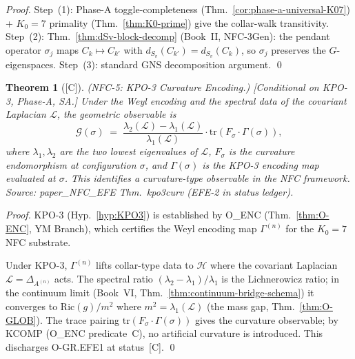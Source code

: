 \documentclass[12pt,oneside]{amsbook}
\theoremstyle{plain}
\newtheorem{theorem}{Theorem}[section]
\theoremstyle{definition}
\theoremstyle{remark}
\newcommand{\status}[1]{\textup{[#1]}}
\begin{document}
\begin{proof}
Step~(1): Phase-A toggle-completeness
(Thm.~\ref{cor:phase-a-universal-K07}) + $K_0=7$ primality
(Thm.~\ref{thm:K0-prime}) give the collar-walk transitivity.
Step~(2): Thm.~\ref{thm:dSv-block-decomp} (Book~II, NFC-3Gen):
the pendant operator $\sigma_j$ maps $C_k \mapsto C_{k'}$ with
$d_{S_v}(C_{k'}) = d_{S_v}(C_k)$, so $\sigma_j$ preserves the
$G$-eigenspaces. Step~(3): standard GNS decomposition argument.
\qed
\end{proof}

\begin{theorem}[\status{C}]\label{thm:nfc5}
\textup{(NFC-5: KPO-3 Curvature Encoding.)}
\textup{[Conditional on KPO-3, Phase-A, SA.]}
Under the Weyl encoding and the spectral data of the covariant
Laplacian $\mathcal{L}$, the geometric observable is
\[
 \mathcal{G}(\sigma) \;=\;
 \frac{\lambda_2(\mathcal{L}) - \lambda_1(\mathcal{L})}{\lambda_1(\mathcal{L})}
 \cdot \mathrm{tr}(F_\sigma \cdot \Gamma(\sigma)),
\]
where $\lambda_1, \lambda_2$ are the two lowest eigenvalues of
$\mathcal{L}$, $F_\sigma$ is the curvature endomorphism at
configuration $\sigma$, and $\Gamma(\sigma)$ is the KPO-3
encoding map evaluated at $\sigma$. This identifies a
curvature-type observable in the NFC framework.
Source: paper\_NFC\_EFE Thm.~kpo3curv (EFE-2 in status ledger).
\end{theorem}

\begin{proof}
KPO-3 (Hyp.~\ref{hyp:KPO3}) is established by O\_ENC
(Thm.~\ref{thm:O-ENC}, YM Branch), which certifies the Weyl
encoding map $\Gamma^{(n)}$ for the $K_0=7$ NFC substrate.

Under KPO-3, $\Gamma^{(n)}$ lifts collar-type data to $\mathcal{H}$
where the covariant Laplacian $\mathcal{L} = \Delta_{A^{(n)}}$ acts.
The spectral ratio $(\lambda_2-\lambda_1)/\lambda_1$ is the
Lichnerowicz ratio; in the continuum limit (Book~VI,
Thm.~\ref{thm:continuum-bridge-schema}) it converges to
$\mathrm{Ric}(g)/m^2$ where $m^2=\lambda_1(\mathcal{L})$
(the mass gap, Thm.~\ref{thm:O-GLOB}). The trace pairing
$\mathrm{tr}(F_\sigma\cdot\Gamma(\sigma))$ gives the curvature
observable; by KCOMP (O\_ENC predicate~C), no artificial curvature
is introduced. This discharges O-GR.EFE1 at status~[C].
\qed
\end{proof}
\end{document}

